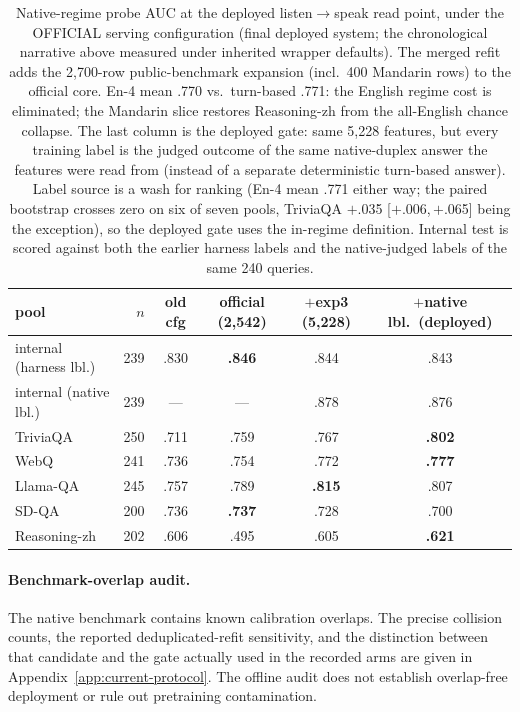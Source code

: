 \begin{table}[t]
\centering\small
\caption{Native-regime probe AUC at the deployed listen$\to$speak
read point, under the OFFICIAL serving configuration (final deployed
system; the chronological narrative above measured under inherited
wrapper defaults). The merged refit adds the 2{,}700-row
public-benchmark expansion (incl.\ 400 Mandarin rows) to the official
core. En-4 mean .770 vs.\ turn-based .771: the English regime cost
is eliminated; the Mandarin slice restores Reasoning-zh from the
all-English chance collapse. The last column is the deployed gate:
same 5{,}228 features, but every training label is the judged
outcome of the same native-duplex answer the features were
read from (instead of a separate deterministic turn-based answer).
Label source is a wash for ranking (En-4 mean .771 either way; the
paired bootstrap crosses zero on six of seven pools, TriviaQA
$+$.035 [$+$.006,\,$+$.065] being the exception), so the deployed
gate uses the in-regime definition. Internal test is scored against both the
earlier harness labels and the native-judged labels of the same
240 queries.}
\label{tab:native-auc}
\scriptsize
\setlength{\tabcolsep}{3.5pt}
\begin{tabular}{lrcccc}
\toprule
pool & $n$ & old cfg & official (2{,}542) & $+$exp3 (5{,}228) & \textbf{$+$native lbl.\ (deployed)} \\
\midrule
internal (harness lbl.) & 239 & .830 & \textbf{.846} & .844 & .843 \\
internal (native lbl.) & 239 & --- & --- & .878 & .876 \\
TriviaQA & 250 & .711 & .759 & .767 & \textbf{.802} \\
WebQ & 241 & .736 & .754 & .772 & \textbf{.777} \\
Llama-QA & 245 & .757 & .789 & \textbf{.815} & .807 \\
SD-QA & 200 & .736 & \textbf{.737} & .728 & .700 \\
Reasoning-zh & 202 & .606 & .495 & .605 & \textbf{.621} \\
\bottomrule
\end{tabular}
\end{table}

\paragraph{Benchmark-overlap audit.}
The native benchmark contains known calibration overlaps. The precise
collision counts, the reported deduplicated-refit sensitivity, and
the distinction between that candidate and the gate actually used in
the recorded arms are given in Appendix~\ref{app:current-protocol}.
The offline audit does not establish overlap-free deployment or rule
out pretraining contamination.

